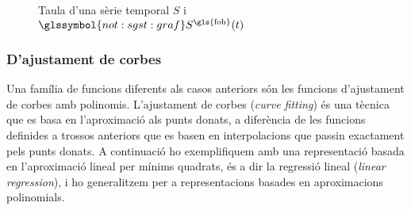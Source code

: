 \begin{example}
\begin{figure}[tp]
   \caption{Taula d'una sèrie temporal $S$ i
     $\glssymbol{not:sgst:graf} S^\text{\gls{foh}}(t)$}
  \label{fig:model:repr:foh}
  \end{figure}

\end{example}





\subsubsection{D'ajustament de corbes}


Una família de funcions diferents als casos anteriors són les funcions
d'ajustament de corbes amb polinomis.  L'ajustament de corbes
(\emph{curve fitting}) és una tècnica que es basa en l'aproximació als
punts donats, a diferència de les funcions definides a trossos
anteriors que es basen en interpolacions que passin exactament pels
punts donats.  A continuació ho exemplifiquem amb una representació
basada en l'aproximació lineal per mínims quadrats, és a dir la
regressió lineal (\emph{linear regression}), i ho generalitzem per a
representacions basades en aproximacions polinomials.

